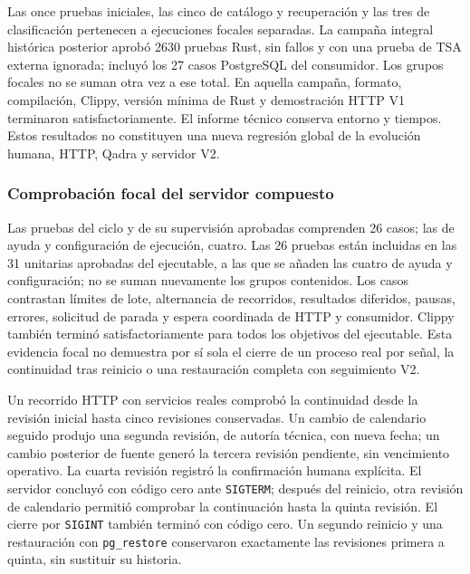Las once pruebas iniciales, las cinco de catálogo y recuperación y las tres de clasificación pertenecen a ejecuciones focales separadas. La campaña integral histórica posterior aprobó 2630 pruebas Rust, sin fallos y con una prueba de TSA externa ignorada; incluyó los 27 casos PostgreSQL del consumidor. Los grupos focales no se suman otra vez a ese total. En aquella campaña, formato, compilación, Clippy, versión mínima de Rust y demostración HTTP V1 terminaron satisfactoriamente. El informe técnico conserva entorno y tiempos. Estos resultados no constituyen una nueva regresión global de la evolución humana, HTTP, Qadra y servidor V2.

\subsubsection{Comprobación focal del servidor compuesto}

Las pruebas del ciclo y de su supervisión aprobadas comprenden 26 casos; las de ayuda y configuración de ejecución, cuatro. Las 26 pruebas están incluidas en las 31 unitarias aprobadas del ejecutable, a las que se añaden las cuatro de ayuda y configuración; no se suman nuevamente los grupos contenidos. Los casos contrastan límites de lote, alternancia de recorridos, resultados diferidos, pausas, errores, solicitud de parada y espera coordinada de HTTP y consumidor. Clippy también terminó satisfactoriamente para todos los objetivos del ejecutable. Esta evidencia focal no demuestra por sí sola el cierre de un proceso real por señal, la continuidad tras reinicio o una restauración completa con seguimiento V2.

Un recorrido HTTP con servicios reales comprobó la continuidad desde la revisión inicial hasta cinco revisiones conservadas. Un cambio de calendario seguido produjo una segunda revisión, de autoría técnica, con nueva fecha; un cambio posterior de fuente generó la tercera revisión pendiente, sin vencimiento operativo. La cuarta revisión registró la confirmación humana explícita. El servidor concluyó con código cero ante \texttt{SIGTERM}; después del reinicio, otra revisión de calendario permitió comprobar la continuación hasta la quinta revisión. El cierre por \texttt{SIGINT} también terminó con código cero. Un segundo reinicio y una restauración con \texttt{pg\_restore} conservaron exactamente las revisiones primera a quinta, sin sustituir su historia.

